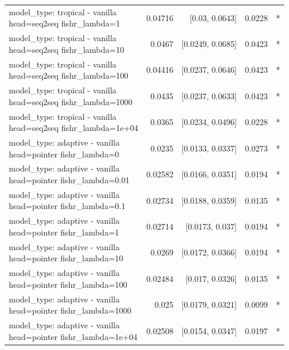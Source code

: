 \documentclass[10pt]{article}
\makeatletter
\newcommand{\stackcell}[1]{\begin{tabular}[t]{@{}l@{}}#1\end{tabular}}
\makeatother
\begin{document}
{\begin{longtable}{lrrrl}
\stackcell{model\_type: tropical - vanilla\\\footnotesize head=seq2seq fishr\_lambda=1 } & 0.04716 & [0.03, 0.0643] & 0.0228 & *\\
\stackcell{model\_type: tropical - vanilla\\\footnotesize head=seq2seq fishr\_lambda=10 } & 0.0467 & [0.0249, 0.0685] & 0.0423 & *\\
\stackcell{model\_type: tropical - vanilla\\\footnotesize head=seq2seq fishr\_lambda=100 } & 0.04416 & [0.0237, 0.0646] & 0.0423 & *\\
\stackcell{model\_type: tropical - vanilla\\\footnotesize head=seq2seq fishr\_lambda=1000 } & 0.0435 & [0.0237, 0.0633] & 0.0423 & *\\
\stackcell{model\_type: tropical - vanilla\\\footnotesize head=seq2seq fishr\_lambda=1e+04 } & 0.0365 & [0.0234, 0.0496] & 0.0228 & *\\
\stackcell{model\_type: adaptive - vanilla\\\footnotesize head=pointer fishr\_lambda=0 } & 0.0235 & [0.0133, 0.0337] & 0.0273 & *\\
\stackcell{model\_type: adaptive - vanilla\\\footnotesize head=pointer fishr\_lambda=0.01 } & 0.02582 & [0.0166, 0.0351] & 0.0194 & *\\
\stackcell{model\_type: adaptive - vanilla\\\footnotesize head=pointer fishr\_lambda=0.1 } & 0.02734 & [0.0188, 0.0359] & 0.0135 & *\\
\stackcell{model\_type: adaptive - vanilla\\\footnotesize head=pointer fishr\_lambda=1 } & 0.02714 & [0.0173, 0.037] & 0.0194 & *\\
\stackcell{model\_type: adaptive - vanilla\\\footnotesize head=pointer fishr\_lambda=10 } & 0.0269 & [0.0172, 0.0366] & 0.0194 & *\\
\stackcell{model\_type: adaptive - vanilla\\\footnotesize head=pointer fishr\_lambda=100 } & 0.02484 & [0.017, 0.0326] & 0.0135 & *\\
\stackcell{model\_type: adaptive - vanilla\\\footnotesize head=pointer fishr\_lambda=1000 } & 0.025 & [0.0179, 0.0321] & 0.0099 & *\\
\stackcell{model\_type: adaptive - vanilla\\\footnotesize head=pointer fishr\_lambda=1e+04 } & 0.02508 & [0.0154, 0.0347] & 0.0197 & *\\

\end{longtable}}
\end{document}

